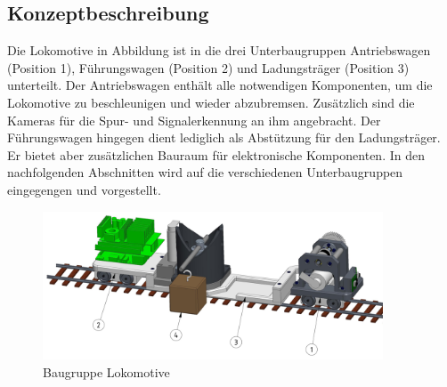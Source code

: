 \documentclass[../../main.tex]{subfiles}
\begin{document}
    \subsection{Konzeptbeschreibung}
    Die Lokomotive in Abbildung ist in die drei Unterbaugruppen Antriebswagen (Position 1), Führungswagen (Position 2) und Ladungsträger (Position 3) unterteilt. Der Antriebswagen enthält alle notwendigen Komponenten, um die Lokomotive zu beschleunigen und wieder abzubremsen. Zusätzlich sind die Kameras für die Spur- und Signalerkennung an ihm angebracht. Der Führungswagen hingegen dient lediglich als Abstützung für den Ladungsträger. Er bietet aber zusätzlichen Bauraum für elektronische Komponenten. In den nachfolgenden Abschnitten wird auf die verschiedenen Unterbaugruppen eingegengen und vorgestellt.

    \begin{figure}[H] %
        \centering
        \includegraphics[width=0.9\textwidth]{Lokomotive.png}
        \caption{Baugruppe Lokomotive}
        \label{fig:bg_lokomotive}
    \end{figure}
\end{document}
